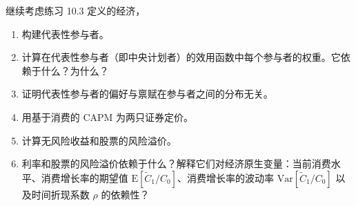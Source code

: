 \begin{problem}
 继续考虑练习 10.3 定义的经济，
\begin{enumerate}[label=(\alph*)]
    \item 构建代表性参与者。
    \item 计算在代表性参与者（即中央计划者）的效用函数中每个参与者的权重。它依赖于什么？为什么？
    \item 证明代表性参与者的偏好与禀赋在参与者之间的分布无关。
    \item 用基于消费的 CAPM 为两只证券定价。
    \item 计算无风险收益和股票的风险溢价。
    \item 利率和股票的风险溢价依赖于什么？解释它们对经济原生变量：当前消费水平、消费增长率的期望值 $\mathrm{E}[\tilde{C}_{1}/C_{0}]$、消费增长率的波动率 $\mathrm{Var}[\tilde{C}_{1}/C_{0}]$ 以及时间折现系数 $\rho$ 的依赖性？
\end{enumerate}
\end{problem}
